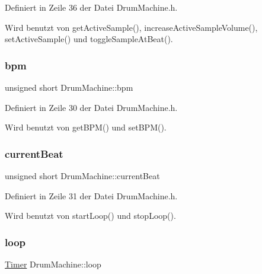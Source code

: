 Definiert in Zeile 36 der Datei Drum\+Machine.\+h.



Wird benutzt von get\+Active\+Sample(), increase\+Active\+Sample\+Volume(), set\+Active\+Sample() und toggle\+Sample\+At\+Beat().

\mbox{\label{class_drum_machine_afaa80be4a66f759ab590a5f67f327b67}} 
\subsubsection{\texorpdfstring{bpm}{bpm}}
{\footnotesize\ttfamily unsigned short Drum\+Machine\+::bpm\hspace{0.3cm}{\ttfamily [private]}}



Definiert in Zeile 30 der Datei Drum\+Machine.\+h.



Wird benutzt von get\+B\+P\+M() und set\+B\+P\+M().

\mbox{\label{class_drum_machine_a46f20be98c71d1429a473e03bf092df3}} 
\subsubsection{\texorpdfstring{current\+Beat}{currentBeat}}
{\footnotesize\ttfamily unsigned short Drum\+Machine\+::current\+Beat\hspace{0.3cm}{\ttfamily [private]}}



Definiert in Zeile 31 der Datei Drum\+Machine.\+h.



Wird benutzt von start\+Loop() und stop\+Loop().

\mbox{\label{class_drum_machine_ab190b1b114840e3fb41fff54d0099e93}} 
\subsubsection{\texorpdfstring{loop}{loop}}
{\footnotesize\ttfamily \hyperlink{class_timer}{Timer} Drum\+Machine\+::loop\hspace{0.3cm}{\ttfamily [private]}}



